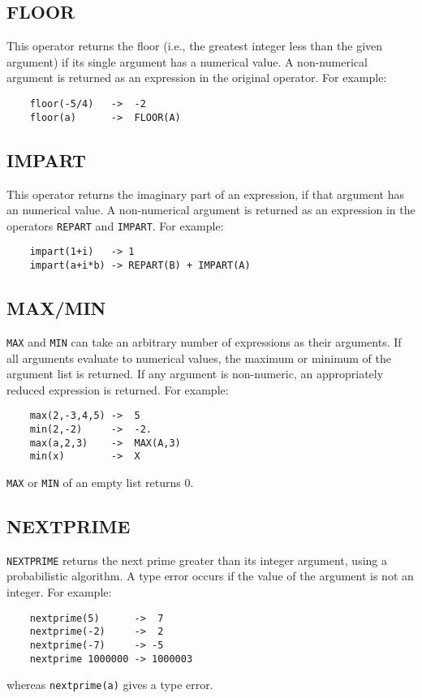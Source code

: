 \subsection{FLOOR}
This operator returns the floor (i.e., the greatest integer less than
the given argument) if its single argument has a numerical value.  A
non-numerical argument is returned as an expression in the original
operator.  For example:

\begin{verbatim}
	floor(-5/4)   ->  -2
	floor(a)      ->  FLOOR(A)
\end{verbatim}

\subsection{IMPART}
This operator returns the imaginary part of an expression, if that argument
has an numerical value.  A non-numerical argument is returned as an expression
in the operators {\tt REPART} and {\tt IMPART}.  For example:
\begin{verbatim}
	impart(1+i)   -> 1
	impart(a+i*b) -> REPART(B) + IMPART(A)
\end{verbatim}

\subsection{MAX/MIN}

{\tt MAX} and {\tt MIN} can take an arbitrary
number of expressions as their arguments.  If all arguments evaluate to
numerical values, the maximum or minimum of the argument list is returned.
If any argument is non-numeric, an appropriately reduced expression is
returned.  For example:
\begin{verbatim}
	max(2,-3,4,5) ->  5
	min(2,-2)     ->  -2.
	max(a,2,3)    ->  MAX(A,3)
	min(x)        ->  X
\end{verbatim}
{\tt MAX} or {\tt MIN} of an empty list returns 0.

\subsection{NEXTPRIME}

{\tt NEXTPRIME} returns the next prime greater than its integer argument,
using a probabilistic algorithm.  A type error occurs if the value of the
argument is not an integer.  For example:
\begin{verbatim}
	nextprime(5)      ->  7
	nextprime(-2)     ->  2
	nextprime(-7)     -> -5
	nextprime 1000000 -> 1000003
\end{verbatim}
whereas {\tt nextprime(a)} gives a type error.

